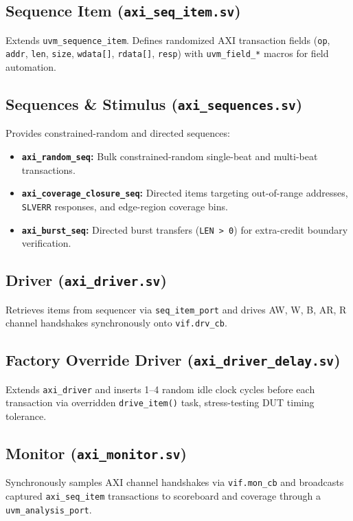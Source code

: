 \documentclass[10pt,a4paper]{article}
\begin{document}
\subsection{Sequence Item (\texttt{axi\_seq\_item.sv})}
Extends \texttt{uvm\_sequence\_item}. Defines randomized AXI transaction fields (\texttt{op}, \texttt{addr}, \texttt{len}, \texttt{size}, \texttt{wdata[]}, \texttt{rdata[]}, \texttt{resp}) with \texttt{uvm\_field\_*} macros for field automation.

\subsection{Sequences \& Stimulus (\texttt{axi\_sequences.sv})}
Provides constrained-random and directed sequences:
\begin{itemize}
    \item \textbf{\texttt{axi\_random\_seq}:} Bulk constrained-random single-beat and multi-beat transactions.
    \item \textbf{\texttt{axi\_coverage\_closure\_seq}:} Directed items targeting out-of-range addresses, \texttt{SLVERR} responses, and edge-region coverage bins.
    \item \textbf{\texttt{axi\_burst\_seq}:} Directed burst transfers (\texttt{LEN > 0}) for extra-credit boundary verification.
\end{itemize}

\subsection{Driver (\texttt{axi\_driver.sv})}
Retrieves items from sequencer via \texttt{seq\_item\_port} and drives AW, W, B, AR, R channel handshakes synchronously onto \texttt{vif.drv\_cb}.

\subsection{Factory Override Driver (\texttt{axi\_driver\_delay.sv})}
Extends \texttt{axi\_driver} and inserts 1--4 random idle clock cycles before each transaction via overridden \texttt{drive\_item()} task, stress-testing DUT timing tolerance.

\subsection{Monitor (\texttt{axi\_monitor.sv})}
Synchronously samples AXI channel handshakes via \texttt{vif.mon\_cb} and broadcasts captured \texttt{axi\_seq\_item} transactions to scoreboard and coverage through a \texttt{uvm\_analysis\_port}.
\end{document}
